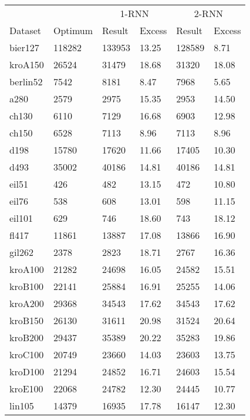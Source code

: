 \begin{figure}[ht]
	\centering
	\begin{minipage}{\linewidth}
		\centering
		\begin{tabular*}{\linewidth}{*{6}{l}}
			\toprule
			&& \multicolumn{2}{c}{1-RNN}& \multicolumn{2}{c}{2-RNN} \\
			\cmidrule(lr){3-4}
			\cmidrule(lr){5-6}
			Dataset & Optimum & Result & Excess & Result & Excess \\
			\midrule
			bier127  & 118282 & 133953 & 13.25 & 128589 & 8.71  \\
			kroA150  & 26524  & 31479  & 18.68 & 31320  & 18.08 \\
			berlin52 & 7542   & 8181   & 8.47  & 7968   & 5.65  \\
			a280     & 2579   & 2975   & 15.35 & 2953   & 14.50 \\
			ch130    & 6110   & 7129   & 16.68 & 6903   & 12.98 \\
			ch150    & 6528   & 7113   & 8.96  & 7113   & 8.96  \\
			d198     & 15780  & 17620  & 11.66 & 17405  & 10.30 \\
			d493     & 35002  & 40186  & 14.81 & 40186  & 14.81 \\
			eil51    & 426    & 482    & 13.15 & 472    & 10.80 \\
			eil76    & 538    & 608    & 13.01 & 598    & 11.15 \\
			eil101   & 629    & 746    & 18.60 & 743    & 18.12 \\
			fl417    & 11861  & 13887  & 17.08 & 13866  & 16.90 \\
			gil262   & 2378   & 2823   & 18.71 & 2767   & 16.36 \\
			kroA100  & 21282  & 24698  & 16.05 & 24582  & 15.51 \\
			kroB100  & 22141  & 25884  & 16.91 & 25255  & 14.06 \\
			kroA200  & 29368  & 34543  & 17.62 & 34543  & 17.62 \\
			kroB150  & 26130  & 31611  & 20.98 & 31524  & 20.64 \\
			kroB200  & 29437  & 35389  & 20.22 & 35283  & 19.86 \\
			kroC100  & 20749  & 23660  & 14.03 & 23603  & 13.75 \\
			kroD100  & 21294  & 24852  & 16.71 & 24603  & 15.54 \\
			kroE100  & 22068  & 24782  & 12.30 & 24445  & 10.77 \\
			lin105   & 14379  & 16935  & 17.78 & 16147  & 12.30 \\

\end{tabular*}
\end{minipage}
\end{figure}
